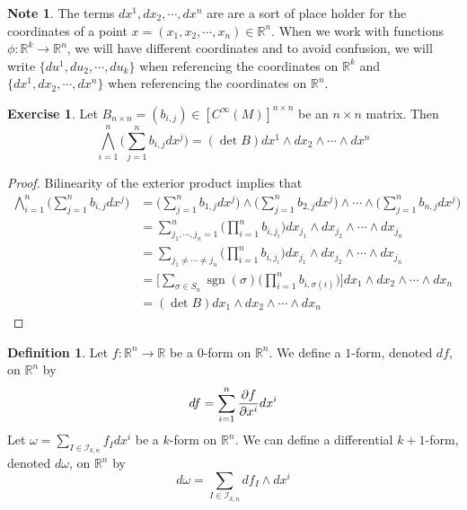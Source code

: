 \documentclass[12pt]{amsart}
\theoremstyle{definition}
\newtheorem{defn}[definition]{Definition}
\newtheorem{note}[definition]{Note}
\newtheorem{ex}[definition]{Exercise}
\newcommand{\sig}{\sigma}
\newcommand{\om}{\omega}
\newcommand{\R}{\mathbb{R}}
\newcommand{\MI}{\mathcal{I}}
\DeclareMathOperator{\sgn}{sgn}
\begin{document}
	
	\begin{note}
		The terms $dx^1, dx_2, \cdots, dx^n$ are are a sort of place holder for the coordinates of a point $x = (x_1, x_2, \cdots, x_n) \in \R^n$. When we work with functions $\phi: \R^k \rightarrow \R^n$, we will have different coordinates and to avoid confusion, we will write $\{du^1, du_2, \cdots, du_k\}$ when referencing the coordinates on $\R^k$ and $\{dx^1, dx_2, \cdots, dx^n\}$ when referencing the coordinates on $\R^n$. 
	\end{note}

	\begin{ex}
		Let $B_{n\times n} = (b_{i,j}) \in [C^{\infty}(M)]^{n \times n}$ be an $n\times n$ matrix. Then $$\bigwedge_{i=1}^n \bigg(\sum_{j=1}^n b_{i,j}dx^j\bigg) = (\det B) dx^1 \wedge dx_2 \wedge \cdots \wedge dx^n$$
	\end{ex}

	\begin{proof}
		Bilinearity of the exterior product implies that
		\begin{align*}
			\bigwedge_{i=1}^n \bigg(\sum_{j=1}^n b_{i,j}dx^j\bigg)
			 &=\bigg(\sum_{j=1}^n b_{1,j}dx^j\bigg) \wedge \bigg(\sum_{j=1}^n b_{2,j}dx^j\bigg) \wedge \cdots \wedge \bigg(\sum_{j=1}^n b_{n,j}dx^j\bigg) \\
			 &= \sum_{j_1, \cdots, j_n = 1}^n \bigg( \prod_{i=1}^n b_{i, j_i} \bigg) dx_{j_1}\wedge  dx_{j_2} \wedge \cdots \wedge  dx_{j_n} \\
			 &= \sum_{j_1 \neq \cdots \neq j_n} \bigg( \prod_{i=1}^n b_{i, j_i} \bigg) dx_{j_1}\wedge  dx_{j_2} \wedge \cdots \wedge  dx_{j_n} \\
			 &= \bigg[ \sum_{\sig \in S_n} \sgn(\sig) \bigg(\prod_{i=1}^n b_{i, \sig(i)} \bigg) \bigg] dx_{1}\wedge  dx_{2} \wedge \cdots \wedge  dx_{n} \\
			 &= (\det B) dx_{1}\wedge  dx_{2} \wedge \cdots \wedge  dx_{n}
		\end{align*} 
		
	\end{proof}

	\begin{defn}
		Let $f: \R^n \rightarrow \R$ be a $0$-form on $\R^n$. We define a $1$-form, denoted $df$, on $\R^n$ by $$df = \sum_{i = 1}^n \pdv{f}{x^i} dx^i$$
		Let $\om = \sum\limits_{I \in \MI_{k,n}} f_Idx^i$ be a $k$-form on $\R^n$. We can define a differential $k+1$-form, denoted $d \om$, on $\R^n$ by $$d\om = \sum\limits_{I \in \MI_{k,n}} df_I\wedge dx^i$$  
	\end{defn}
\end{document}
